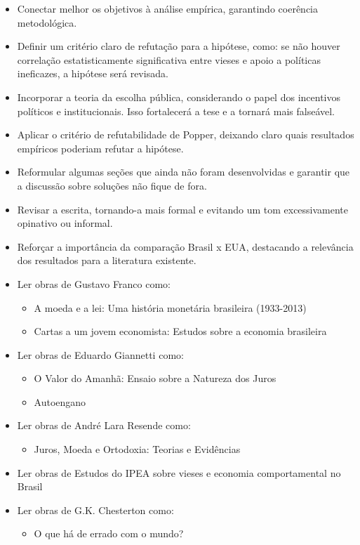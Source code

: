 \documentclass[
	article,
	12pt,
	oneside,
	a4paper,
	english,
	brazil,
	sumario=tradicional
]{abntex2}
\begin{document}
\begin{itemize}
  \item Conectar melhor os objetivos à análise empírica, garantindo coerência metodológica.
  \item Definir um critério claro de refutação para a hipótese, como: se não houver correlação estatisticamente significativa entre vieses e apoio a políticas ineficazes, a hipótese será revisada.
  \item Incorporar a teoria da escolha pública, considerando o papel dos incentivos políticos e institucionais. Isso fortalecerá a tese e a tornará mais falseável.
  \item Aplicar o critério de refutabilidade de Popper, deixando claro quais resultados empíricos poderiam refutar a hipótese.
  \item Reformular algumas seções que ainda não foram desenvolvidas e garantir que a discussão sobre soluções não fique de fora.
  \item Revisar a escrita, tornando-a mais formal e evitando um tom excessivamente opinativo ou informal.
  \item Reforçar a importância da comparação Brasil x EUA, destacando a relevância dos resultados para a literatura existente.
  \item Ler obras de Gustavo Franco como: \begin{itemize}
    \item A moeda e a lei: Uma história monetária brasileira (1933-2013)
    \item Cartas a um jovem economista: Estudos sobre a economia brasileira
    \end{itemize}
  \item Ler obras de Eduardo Giannetti como: \begin{itemize}
    \item O Valor do Amanhã: Ensaio sobre a Natureza dos Juros
    \item Autoengano
  \end{itemize}
  \item Ler obras de André Lara Resende como: \begin{itemize}
    \item Juros, Moeda e Ortodoxia: Teorias e Evidências
  \end{itemize}
  \item Ler obras de Estudos do IPEA sobre vieses e economia comportamental no Brasil
  \item Ler obras de G.K. Chesterton como: \begin{itemize}
    \item O que há de errado com o mundo?

\end{itemize}
\end{itemize}
\end{document}
